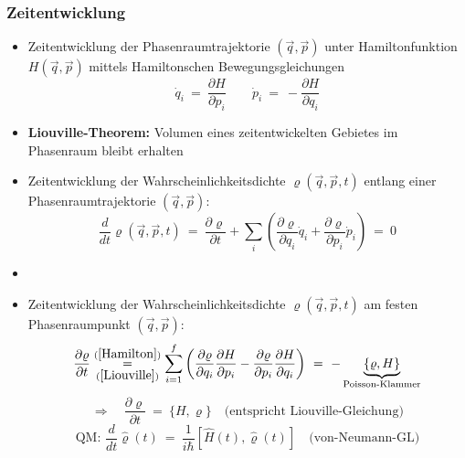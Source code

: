 \subsubsection*{Zeitentwicklung}
\begin{itemize}
    \item Zeitentwicklung der Phasenraumtrajektorie $(\Vec{q}, \Vec{p})$ unter Hamiltonfunktion $H(\Vec{q}, \Vec{p})$ mittels Hamiltonschen Bewegungsgleichungen
    \begin{equation}\label{Hamilton}
        \dot{q}_i \ = \ \frac{\partial H}{\partial p_i} \qquad \dot{p}_i \ = \ -\frac{\partial H}{\partial q_i}
    \end{equation}
    \item \textbf{Liouville-Theorem:} Volumen eines zeitentwickelten Gebietes im Phasenraum bleibt erhalten
    \item Zeitentwicklung der Wahrscheinlichkeitsdichte $\varrho(\Vec{q}, \Vec{p}, t)$ entlang einer Phasenraumtrajektorie $(\Vec{q}, \Vec{p})$:
    \begin{equation}\label{Liouville}
        \frac{d}{dt} \varrho(\Vec{q}, \Vec{p}, t) \ = \ \frac{\partial \varrho}{\partial t} + \sum_i \left( \frac{\partial \varrho}{\partial q_i} \Dot{q}_i + \frac{\partial \varrho}{\partial p_i} \Dot{p}_i \right) \ = \ 0
    \end{equation}
    \item[] 
    \item Zeitentwicklung der Wahrscheinlichkeitsdichte $\varrho(\Vec{q}, \Vec{p}, t)$ am festen Phasenraumpunkt $(\Vec{q}, \Vec{p})$:
    \begin{equation}
        \frac{\partial \varrho}{\partial t} \overset{\equa{Hamilton}}{\underset{\equa{Liouville}}{=}} \sum_{i=1}^f \left( \frac{\partial \varrho}{\partial q_i} \frac{\partial H}{\partial p_i} - \frac{\partial \varrho}{\partial p_i} \frac{\partial H}{\partial q_i} \right) \ = \ - \underbrace{\{ \varrho, H\}}_{\text{Poisson-Klammer}}
    \end{equation}
    \begin{equation}
        \Longrightarrow \quad \frac{\partial \varrho}{\partial t} \ = \ \{ H, \varrho\} \quad \text{(entspricht Liouville-Gleichung)}
    \end{equation}
    \begin{equation}
        \text{QM: } \frac{d}{dt} \hat{\varrho}(t) \ = \ \frac{1}{i \hbar} [\hat{H}(t), \hat{\varrho}(t)] \quad \text{(von-Neumann-GL)}
    \end{equation}
\end{itemize}
